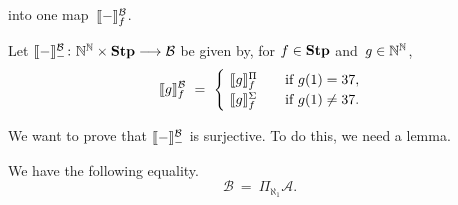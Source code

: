 into one map~$\decode{-}^\mathcal{B}_f$.
\begin{dfn}
Let
$\decode{-}^{\mathcal{B}}_{-}\colon 
  \N^\N\times \Stump \longrightarrow \mathcal{B}$
be given by, for $f\in\mathbf{Stp}$ and~$g\in\mathbb{N}^{\mathbb{N}}$,
\begin{equation}
\label{eq:decode-Borel}
\decode{g}^{\mathcal{B}}_f \ = \ 
\begin{cases}
\  \decode{g}^{\Pi}_f  \quad
& \text{if $g(1)= 37$},\\

\ \decode{g}^{\Sigma}_f
& \text{if $g(1)\neq 37$}.
\end{cases}
\end{equation}
\end{dfn}
We want to prove that $\decode{-}_{-}^\mathcal{B}$
is surjective. 
To do this,
we need a lemma.
\begin{lem}
\label{L:Borel-aleph1}
We have the following equality.
\begin{equation}
\label{eq:Borel-aleph1}
\mathcal{B} \ =\  \Pi_{\aleph_1} \mathcal{A}.
\end{equation}
\end{lem}
